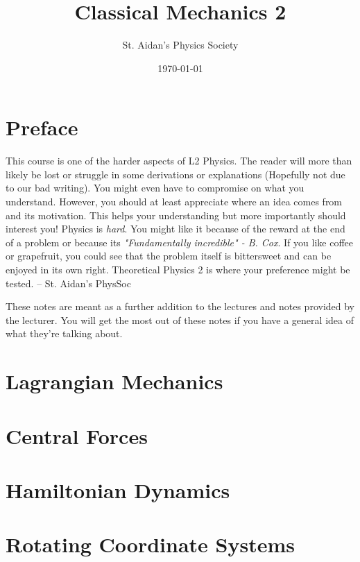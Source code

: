 \documentclass[10pt,%
               a4paper]{physics_notes}
\begin{document}
\title{Classical Mechanics 2}
\author{St. Aidan's Physics Society}
\date{\today}
\maketitle

\tableofcontents
\newpage

\section{Preface}
This course is one of the harder aspects of L2 Physics. The reader will more than likely be lost or struggle in some derivations or explanations (Hopefully not due to our bad writing). You might even have to compromise on what you understand. However, you should at least appreciate where an idea comes from and its motivation. This helps your understanding but more importantly should interest you! Physics is \textit{hard}. You might like it because of the reward at the end of a problem or because its \textit{"Fundamentally incredible" - B. Cox}. If you like coffee or grapefruit, you could see that the problem itself is bittersweet and can be enjoyed in its own right.  Theoretical Physics 2 is where your preference might be tested. -- St. Aidan's PhysSoc\par



These notes are meant as a further addition to the lectures and notes provided by the lecturer. You will get the most out of these notes if you have a general idea of what they're talking about.
\newpage

\section{Lagrangian Mechanics}



\section{Central Forces}


\section{Hamiltonian Dynamics}


\section{Rotating Coordinate Systems}


 
\end{document}

